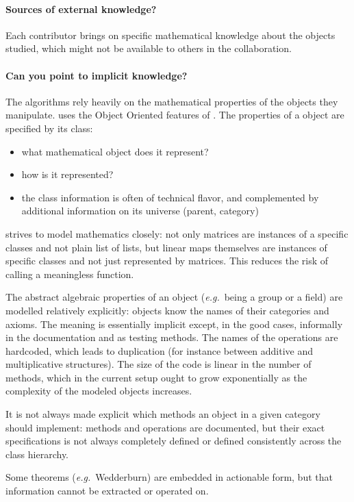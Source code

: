 \paragraph{Sources of external knowledge?}
Each \SageMath contributor brings on specific mathematical knowledge about the objects studied, which might not be available to others in the collaboration.

\paragraph{Can you point to implicit knowledge?}
The algorithms rely heavily on the mathematical properties of the objects they manipulate.
\SageMath uses the Object Oriented features of \python.
The properties of a \SageMath object are specified by its \python class:
\begin{itemize}
\item what mathematical object does it represent?
\item how is it represented?
\item the class information is often of technical flavor, and complemented
  by additional information on its universe (parent, category)
\end{itemize}

\SageMath strives to model mathematics closely: not only matrices are instances of a specific classes and not plain list of lists,  but linear maps themselves are instances of specific classes and not just represented by matrices. This reduces the  risk of calling a meaningless function.

The abstract algebraic properties of an object (\emph{e.g.}~being a group or a field) are modelled relatively explicitly: objects know the names of their categories and axioms.  The meaning is essentially implicit except, in the good cases, informally in the documentation and as testing methods. The names of the operations are hardcoded, which leads to duplication (for instance between additive and multiplicative structures). The size of the code is linear in the number of methods, which in the current setup ought to grow exponentially as the complexity of the modeled objects increases.

It is not always made explicit which methods an object in a given category should implement: methods and operations are documented, but their exact specifications is not always completely defined or defined consistently across the class hierarchy.

Some theorems (\emph{e.g.}~Wedderburn) are embedded in actionable form,  but that information cannot be extracted or operated on.

